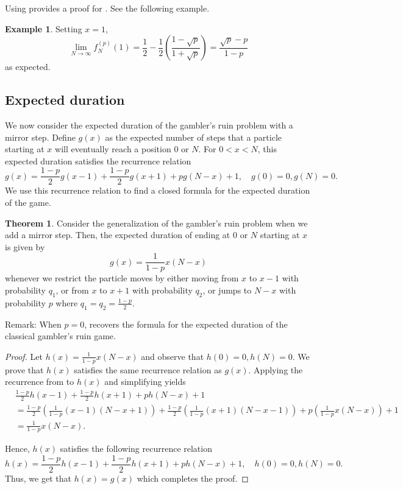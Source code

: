 \documentclass[reqno]{amsart}
\theoremstyle{definition}
\newtheorem{theorem}{Theorem}[section]
\newtheorem{example}{Example}
\theoremstyle{definition}
\theoremstyle{remark}
\begin{document}
Using  provides a proof for . See the following example.
\begin{example}
Setting $x=1$,
\[\lim_{N\to \infty} f_N^{(p)}(1)=\frac{1}{2}-\frac{1}{2}\left(\frac{1-\sqrt{p}}{1+\sqrt{p}}\right)=\frac{\sqrt{p}-p}{1-p}\] as expected.
\end{example}


\subsection{Expected duration}

We now consider the expected duration of the gambler's ruin problem with a mirror step. Define $g(x)$ as the expected number of steps that a particle starting at $x$ will eventually reach a position $0$ or $N$. For $0<x<N$, this expected duration satisfies the recurrence relation
    \begin{equation} \label{eq:mirror exp}
        g(x)=\frac{1-p}{2}g(x-1)+\frac{1-p}{2}g(x+1) + pg(N-x) +1, \quad g(0)=0, g(N)=0.
    \end{equation}
We use this recurrence relation to find a closed formula for the expected duration of the game.
\begin{theorem}\label{thm:expected duration mirror}
Consider the generalization of the gambler's ruin problem when we add a mirror step. Then, the expected duration of ending at $0$ or $N$ starting at $x$ is given by
\begin{equation*}
    g(x)=\frac{1}{1-p}x(N-x)
\end{equation*}
whenever we restrict the particle moves by either moving from $x$ to $x-1$ with probability $q_1$, or from $x$ to $x+1$ with probability $q_2$, or jumps to $N-x$ with probability $p$ where $q_1=q_2=\frac{1-p}{2}$.
\end{theorem}
Remark: When $p=0$,  recovers the formula for the expected duration of the classical gambler's ruin game.


\begin{proof}
Let $h(x)=\frac{1}{1-p}x(N-x)$ and observe that $h(0)=0, h(N)=0$. We prove that $h(x)$ satisfies the same recurrence relation as $g(x)$. Applying the recurrence from  to $h(x)$ and simplifying yields 
\begin{align*}
    &\frac{1-p}{2}h(x-1) +\frac{1-p}{2}h(x+1)+ph(N-x)+1\\
    &=  \frac{1-p}{2}\left(\frac{1}{1-p}(x-1)(N-x+1)\right)+\frac{1-p}{2}\left(\frac{1}{1-p}(x+1)(N-x-1)\right)+p\left(\frac{1}{1-p}x(N-x)\right)+1\\
    &=\frac{1}{1-p}x(N-x).
\end{align*}

Hence, $h(x)$ satisfies the following recurrence relation 
\begin{equation*}
    h(x)=\frac{1-p}{2}h(x-1) +\frac{1-p}{2}h(x+1)+ph(N-x)+1, \quad h(0)=0, h(N)=0.
\end{equation*}
Thus, we get that $h(x)=g(x)$ which completes the proof.
\end{proof}
\end{document}
